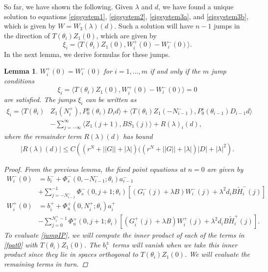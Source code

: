 \documentclass[12pt]{article}
\newtheorem{lemma}{Lemma}
\begin{document}
So far, we have shown the following. Given $\lambda$ and $d$, we have found a unique solution to equations \eqref{eigsystem1}, \eqref{eigsystem2}, \eqref{eigsystem3a}, and \eqref{eigsystem3b}, which is given by $W = W_3(\lambda)(d)$. Such a solution will have $n-1$ jumps in the direction of $T(\theta_i) Z_1(0)$, which are given by
\begin{equation}\label{jumpIP}
\xi_i = \langle T(\theta_i) Z_1(0), W_i^+(0) - W_i^-(0) \rangle.
\end{equation}
In the next lemma, we derive formulas for these jumps.

\begin{lemma}\label{jumpcond}
$W_i^+(0) = W_i^-(0)$ for $i = 1, \dots, m$ if and only if the $m$ jump conditions
\begin{equation}\label{xicond}
\xi_i = \langle T(\theta_i) Z_1(0), W_i^+(0) - W_i^-(0) \rangle = 0
\end{equation}
are satisfied. The jumps $\xi_i$ can be written as 
\begin{equation}\label{xieq}
\begin{aligned}
\xi_i = \langle T(\theta_i) &Z_1(N_i^+), P_0^u(\theta_i) D_i d \rangle 
+ \langle T(\theta_i) Z_1(-N_{i-1}^-), P_0^s(\theta_{i-1}) D_{i-1} d \rangle \\ 
&- \sum_{j = -\infty}^{\infty} \langle Z_1(j+1), B S_1(j)\rangle + R(\lambda)_i(d),
\end{aligned}
\end{equation}
where the remainder term $R(\lambda)(d)$ has bound
\begin{align}\label{xiRbound}
|R(\lambda)(d)| \leq C\left( (r^N + ||G|| + |\lambda|)( (r^N + ||G|| + |\lambda|)|D| + |\lambda|^2 \right).
\end{align}

\begin{proof}
From the previous lemma, the fixed point equations at $n = 0$ are given by 
\begin{equation}\label{fpat0}
\begin{aligned}
W_i^-(0) &= b_i^- +
\Phi_s^-(0, -N_{i-1}^-; \theta_i) a_{i-1}^- \\
&+ \sum_{j = -N_{i-1}^-}^{-1} \Phi_s^-(0, j+1; \theta_i)
[(G_i^-(j) + \lambda B) W_i^-(j) + \lambda^2 d_i B \tilde{H}_i^-(j)] \\
W_i^+(0) &= b_i^+ + \Phi_u^+(0, N_i^+; \theta_i) a_i^+ \\
&- \sum_{j = 0}^{N_i^+-1} \Phi_u^+(0, j+1; \theta_i) 
[(G_i^+(j) + \lambda B) W_i^+(j) + \lambda^2 d_i B \tilde{H}_i^+(j)].
\end{aligned}
\end{equation}
To evaluate \eqref{jumpIP}, we will compute the inner product of each of the terms in \eqref{fpat0} with $T(\theta_i)Z_1(0)$. The $b_i^\pm$ terms will vanish when we take this inner product since they lie in spaces orthogonal to $T(\theta_i) Z_1(0)$. We will evaluate the remaining terms in turn. 


\end{proof}
\end{lemma}
\end{document}
